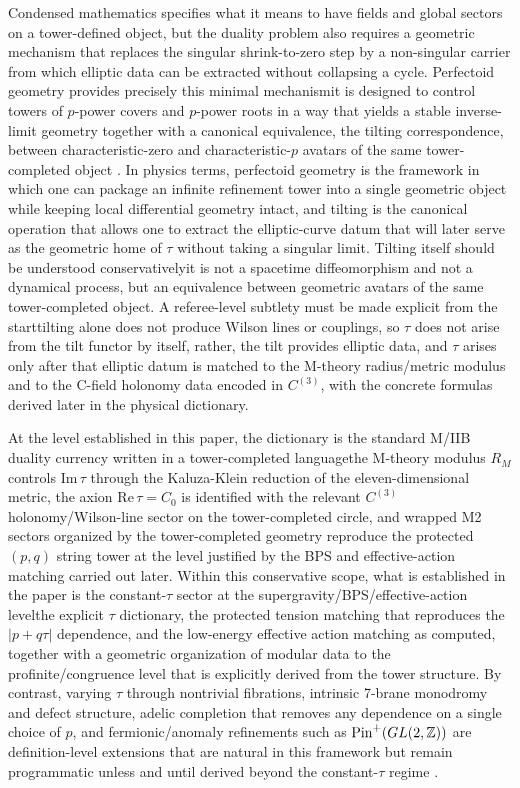 \documentclass[11pt]{article}
\theoremstyle{remark}
\newcommand{\Z}{\mathbb{Z}}
\begin{document}
Condensed mathematics specifies what it means to have fields and global sectors on a tower-defined object, but the duality problem also requires a geometric mechanism that replaces the singular shrink-to-zero step by a non-singular carrier from which elliptic data can be extracted without collapsing a cycle. Perfectoid geometry provides precisely this minimal mechanism\:it is designed to control towers of \(p\)-power covers and \(p\)-power roots in a way that yields a stable inverse-limit geometry together with a canonical equivalence, the tilting correspondence, between characteristic-zero and characteristic-\(p\) avatars of the same tower-completed object \cite{Scholze2012, BhattScholze2019, KedlayaLiu2015, ScholzeWeinstein2017}. In physics terms, perfectoid geometry is the framework in which one can package an infinite refinement tower into a single geometric object while keeping local differential geometry intact, and tilting is the canonical operation that allows one to extract the elliptic-curve datum that will later serve as the geometric home of \(\tau\) without taking a singular limit. Tilting itself should be understood conservatively\:it is not a spacetime diffeomorphism and not a dynamical process, but an equivalence between geometric avatars of the same tower-completed object. A referee-level subtlety must be made explicit from the start\:tilting alone does not produce Wilson lines or couplings, so \(\tau\) does not arise from the tilt functor by itself, rather, the tilt provides elliptic data, and \(\tau\) arises only after that elliptic datum is matched to the M-theory radius/metric modulus and to the C-field holonomy data encoded in \(C^{(3)}\), with the concrete formulas derived later in the physical dictionary.

At the level established in this paper, the dictionary is the standard M/IIB duality currency written in a tower-completed language\:the M-theory modulus \(R_{M}\) controls \(\mathrm{Im}\,\tau\) through the Kaluza-Klein reduction of the eleven-dimensional metric, the axion \(\mathrm{Re}\,\tau=C_{0}\) is identified with the relevant \(C^{(3)}\) holonomy/Wilson-line sector on the tower-completed circle, and wrapped M2 sectors organized by the tower-completed geometry reproduce the protected \((p,q)\) string tower at the level justified by the BPS and effective-action matching carried out later. Within this conservative scope, what is established in the paper is the constant-\(\tau\) sector at the supergravity/BPS/effective-action level\:the explicit \(\tau\) dictionary, the protected tension matching that reproduces the \(|p+q\tau|\) dependence, and the low-energy effective action matching as computed, together with a geometric organization of modular data to the profinite/congruence level that is explicitly derived from the tower structure. By contrast, varying \(\tau\) through nontrivial fibrations, intrinsic 7-brane monodromy and defect structure, adelic completion that removes any dependence on a single choice of \(p\), and fermionic/anomaly refinements such as \({\rm Pin}^{+}(GL(2,\Z))\) are definition-level extensions that are natural in this framework but remain programmatic unless and until derived beyond the constant-\(\tau\) regime \cite{DebrayDieriglHeckmanMontero2021}.
\end{document}
